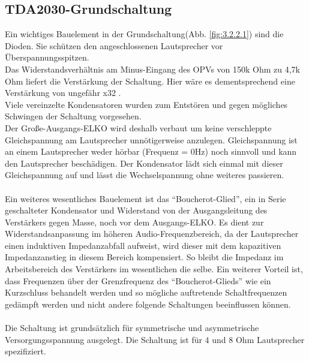 \subsection{TDA2030-Grundschaltung}\label{subsec:3.2.2}
Ein wichtiges Bauelement in der Grundschaltung(Abb. \ref{fig:3.2.2.1}) sind die Dioden. Sie schützen den angeschlossenen Lautsprecher vor Überspannungsspitzen.\\
Das Widerstandsverhältnis am Minus-Eingang des OPVs von 150k Ohm zu 4,7k Ohm liefert die Verstärkung der Schaltung. Hier wäre es dementsprechend eine Verstärkung von ungefähr x32 .\\
Viele vereinzelte Kondensatoren wurden zum Entstören und gegen mögliches Schwingen der Schaltung vorgesehen.\\
Der Große-Ausgangs-ELKO wird deshalb verbaut um keine verschleppte Gleichspannung am Lautsprecher unnötigerweise anzulegen. Gleichspannung ist an einem Lautsprecher weder hörbar (Frequenz = 0Hz) noch sinnvoll und kann den Lautsprecher beschädigen. Der Kondensator lädt sich einmal mit dieser Gleichspannung auf und lässt die Wechselspannung ohne weiteres passieren.\\\\
Ein weiteres wesentliches Bauelement ist das \enquote{Boucherot-Glied}, ein in Serie geschalteter Kondensator und Widerstand von der Ausgangsleitung des Verstärkers gegen Masse, noch vor dem Ausgangs-ELKO. Es dient zur Widerstandsanpassung im höheren Audio-Frequenzbereich, da der Lautsprecher einen induktiven Impedanzabfall aufweist, wird dieser mit dem kapazitiven Impedanzanstieg in diesem Bereich kompensiert. So bleibt die Impedanz im Arbeitsbereich des Verstärkers im wesentlichen die selbe. Ein weiterer Vorteil ist, dass Frequenzen über der Grenzfrequenz des \enquote{Boucherot-Glieds} wie ein Kurzschluss behandelt werden und so mögliche auftretende Schaltfrequenzen gedämpft werden und nicht andere folgende Schaltungen beeinflussen können.\\\\
Die Schaltung ist grundsätzlich für symmetrische und asymmetrische Versorgungsspannung ausgelegt. Die Schaltung ist für 4 und 8 Ohm Lautsprecher spezifiziert.
